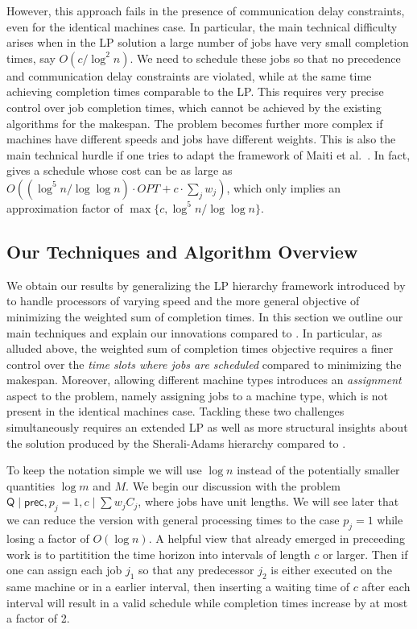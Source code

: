   However, this approach fails in the presence of communication delay constraints, even for the identical machines case.
  In particular, the main technical difficulty arises when in the LP solution a large number of jobs have very small completion times, say $O(c/\log^2 n)$.
  We need to schedule these jobs so that no precedence and communication delay constraints are violated, while at the same time achieving completion times comparable to the LP.
  This requires very precise control over job completion times, which cannot be achieved by the existing algorithms for the makespan.
  The problem becomes further more complex if machines have different speeds and jobs have different weights.
  This is also the main technical hurdle if one tries to adapt the framework of Maiti {et al.}~\cite{MRSSV}.
  In fact,  \cite{MRSSV} gives a schedule whose cost can be as large as $O\left ((\log^5 n/\log \log n) \cdot OPT + c \cdot \sum_{j} w_j \right)$, which only implies an approximation factor of $\max \{c, \log^5 n/\log \log n \}$.
  
  
  
  \subsection{Our Techniques and Algorithm Overview}
  
  We obtain our results by generalizing the LP hierarchy framework introduced by \cite{DKRTZ20} to handle processors of varying speed and the more general objective of minimizing the weighted sum of completion times. In this section we outline our main techniques and explain our innovations compared to \cite{DKRTZ20}. In particular, as alluded above, the weighted sum of completion times objective requires a finer control over the {\em time slots where jobs are scheduled} compared to minimizing the makespan. Moreover, allowing different machine types introduces an {\em assignment} aspect to the problem, namely assigning jobs to a machine type, which is not present in the identical machines case.
  Tackling these two challenges simultaneously requires an extended LP as well as more structural insights about the solution produced by the Sherali-Adams hierarchy compared to \cite{DKRTZ20}. 
  
  \medskip
  To keep the notation simple we will use $\log n$ instead of the potentially smaller quantities $\log m$ and $M$. 
  We begin our discussion with the problem $\mathsf{Q} \mid \mathsf{prec}, p_j=1, c \mid \sum w_jC_j$, where jobs have unit lengths. 
  We will see later that we can reduce the version with general processing times to the case $p_j=1$ while losing a factor of $O(\log n)$. A helpful view that already emerged in preceeding work is to partitition the time horizon into intervals of length $c$ or larger. Then if one can assign each job $j_1$ so that any predecessor $j_2$ is either executed on the same machine or in a earlier interval, then inserting a waiting time of $c$ after each interval will result in a valid schedule while completion times increase by at most a factor of 2.
  
